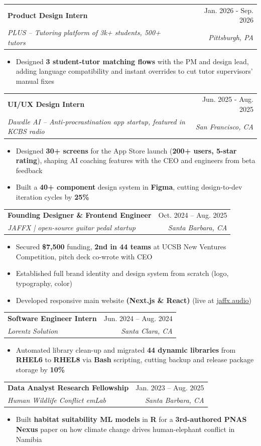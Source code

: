 \documentclass[letterpaper,11pt]{article}
\makeatletter
\newcommand{\resumeItem}[1]{
  \item\small{
    {#1 \vspace{-3pt}}
  }
}
\newcommand{\resumeSubheading}[4]{
  \vspace{-2pt}\item
    \begin{tabular*}{0.97\textwidth}[t]{l@{\extracolsep{\fill}}r}
      \textbf{#1} & #2 \\
      \textit{\small#3} & \textit{\small #4} \\
    \end{tabular*}\vspace{-7pt}
}
\newcommand{\resumeSubSubheading}[2]{
    \item
    \begin{tabular*}{0.97\textwidth}{l@{\extracolsep{\fill}}r}
      \textit{\small#1} & \textit{\small #2} \\
    \end{tabular*}\vspace{-7pt}
}
\newcommand{\resumeSubHeadingListEnd}{\end{itemize}\vspace{-5pt}}
\newcommand{\resumeItemListStart}{\begin{itemize}}
\newcommand{\resumeItemListEnd}{\end{itemize}\vspace{-5pt}}
\makeatother
\begin{document}
\resumeSubheading
{Product Design Intern}{Jan. 2026 - Sep. 2026}
{PLUS -- Tutoring platform of 3k+ students, 500+ tutors}{Pittsburgh, PA}
\resumeItemListStart
\resumeItem{Designed \textbf{3 student-tutor matching flows} with the PM and design lead, adding language compatibility and instant overrides to cut tutor supervisors' manual fixes}
\resumeItemListEnd

\resumeSubheading
{UI/UX Design Intern}{Jun. 2025 - Aug. 2025}
{Dawdle AI -- Anti-procrastination app startup, featured in KCBS radio}{San Francisco, CA}
\resumeItemListStart
\resumeItem{Designed \textbf{30+ screens} for the App Store launch (\textbf{200+ users, 5-star rating}), shaping AI coaching features with the CEO and engineers from beta feedback}
\resumeItem{Built a \textbf{40+ component} design system in \textbf{Figma}, cutting design-to-dev iteration cycles by \textbf{25\%}}
\resumeItemListEnd

\resumeSubheading
{Founding Designer \& Frontend Engineer}{Oct. 2024 -- Aug. 2025}
{JAFFX | open-source guitar pedal startup}{Santa Barbara, CA}
\resumeItemListStart
\resumeItem{Secured \textbf{\$7,500} funding, \textbf{2nd in 44 teams} at UCSB New Ventures Competition, pitch deck co-wrote with CEO}
\resumeItem{Established full brand identity and design system from scratch (logo, typography, color)}
\resumeItem{Developed responsive main website \textbf{(Next.js \& React)} (live at \href{https://jaffx.audio}{\underline{jaffx.audio}})}
\resumeItemListEnd

\resumeSubheading
{Software Engineer Intern}{Jun. 2024 -- Aug. 2024}
{Lorentz Solution}{Santa Clara, CA}
\resumeItemListStart
\resumeItem{Automated library clean-up and migrated \textbf{44 dynamic libraries} from \textbf{RHEL6} to \textbf{RHEL8} via \textbf{Bash} scripting, cutting backup and release package storage by \textbf{10\%}}
\resumeItemListEnd

\resumeSubheading
{Data Analyst Research Fellowship}{Jan. 2023 -- Aug. 2025}
{Human Wildlife Conflict emLab}{Santa Barbara, CA}
\resumeItemListStart
\resumeItem{Built \textbf{habitat suitability ML models} in \textbf{R} for a \textbf{3rd-authored PNAS Nexus} paper on how climate change drives human-elephant conflict in Namibia}
\resumeItemListEnd

\end{document}
